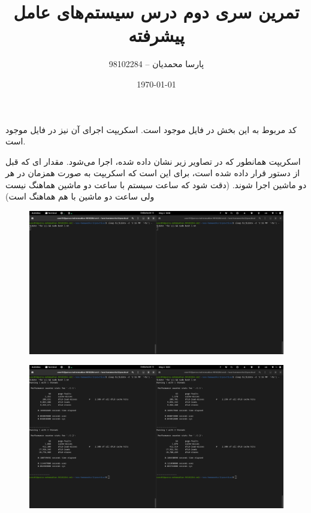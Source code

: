 \documentclass{article}
\title{تمرین سری دوم درس سیستم‌های عامل پیشرفته}
\author{پارسا محمدیان -- 98102284}
\date{\today}
\begin{document}
\maketitle

\section{}
کد مربوط به این بخش در فایل 
موجود است. اسکریپت اجرای آن نیز در فایل 
موجود است. 

اسکریپت همانطور که در تصاویر زیر نشان داده شده،‌ اجرا می‌شود. 
مقدار 
ای 
که قبل از دستور قرار داده شده است، برای این است که اسکریپت به صورت همزمان در هر دو ماشین 
اجرا شوند. (دقت شود که ساعت سیستم با ساعت دو ماشین هماهنگ نیست ولی ساعت دو ماشین 
با هم هماهنگ است)

\begin{figure}[H]
   \centering
   \includegraphics[width=\linewidth]{1-command.png}
\end{figure}
\begin{figure}[H]
   \centering
   \includegraphics[width=\linewidth]{1-result.png}
\end{figure}
\end{document}
